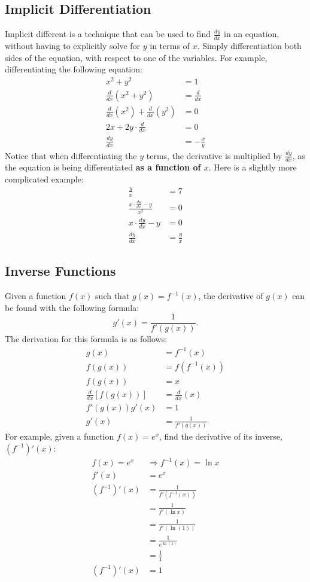 \documentclass[12pt]{article}
\begin{document}
\subsection{Implicit Differentiation}
Implicit different is a technique that can be used to find $\frac{dy}{dx}$ in an equation, without having to explicitly solve for $y$ in terms of $x$. Simply differentiation both sides of the equation, with respect to one of the variables. For example, differentiating the following equation:
\begin{align*}
	x^2 + y^2 &= 1 \\
	\frac{d}{dx} (x^2 + y^2) &= \frac{d}{dx} \\[5pt]
	\frac{d}{dx} (x^2) + \frac{d}{dx} (y^2) &= 0 \\[5pt]
	2x + 2y \cdot \frac{d}{dx} &= 0 \\[5pt]
	\frac{dy}{dx} &= -\frac{x}{y}
\end{align*}
Notice that when differentiating the $y$ terms, the derivative is multiplied by $\frac{dy}{dx}$, as the equation is being differentiated \textbf{as a function of $x$}. Here is a slightly more complicated example:
\begin{align*}
	\frac{y}{x} &= 7 \\[5pt]
	\frac{x \cdot \frac{dy}{dx} - y}{x^2} &= 0 \\[5pt]
	x \cdot \frac{dy}{dx} - y &= 0 \\[5pt]
	\frac{dy}{dx} &= \frac{y}{x}
\end{align*}

\subsection{Inverse Functions}
Given a function $f(x)$ such that $g(x) = f^{-1}(x)$, the derivative of $g(x)$ can be found with the following formula:
\[ g'(x) = \frac{1}{f'(g(x))}. \]
The derivation for this formula is as follows:
\begin{align*}
	g(x) &= f^{-1}(x) \\
	f(g(x)) &= f(f^{-1}(x)) \\
	f(g(x)) &= x \\
	\frac{d}{dx} \left[ f(g(x)) \right] &= \frac{d}{dx} (x) \\[5pt]
	f'(g(x)) g'(x) &= 1 \\
	g'(x) &= \frac{1}{f'(g(x))}
\end{align*}
For example, given a function $f(x) = e^x$, find the derivative of its inverse, $(f^{-1})'(x)$:
\begin{align*}
	f(x) = e^x &\Rightarrow f^{-1}(x) = \ln{x} \\
	f'(x) &= e^x \\
	(f^{-1})'(x) &= \frac{1}{f' \left( f^{-1}(x) \right)} \\[5pt]
	&= \frac{1}{f'(\ln{x})} \\[5pt]
	&= \frac{1}{f'(\ln{(1)})} \\[5pt]
	&= \frac{1}{e^{\ln{(1)}}} \\[5pt]
	&= \frac{1}{1} \\[5pt]
	(f^{-1})'(x) &= 1
\end{align*}
\end{document}

